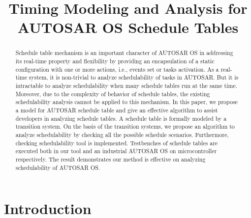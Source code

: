 \documentclass[10pt,conference]{IEEEtran}
\begin{document}
\title{Timing Modeling and Analysis for AUTOSAR OS Schedule Tables}

\author{
}
\maketitle
\begin{abstract}
Schedule table mechanism is an important character of AUTOSAR OS in addressing its real-time property and flexibility by providing an encapsulation of a static configuration with one or more actions, i.e., events set or tasks activation. As a real-time system, it is non-trivial to analyze schedulability of tasks in AUTOSAR. But it is intractable to analyze schedulability when many schedule tables run at the same time. Moreover, due to the complexity of behavior of schedule tables, the existing schedulability analysis cannot be applied to this mechanism. In this paper, we propose a model for AUTOSAR schedule table and give an effective algorithm to assist developers in analyzing schedule tables. A schedule table is formally modeled by a transition system. On the basis of the transition systems, we propose an algorithm to analyze schedulability by checking all the possible schedule scenarios. Furthermore, checking schedulability tool is implemented. Testbenches of schedule tables are executed both in our tool and an industrial AUTOSAR OS on microcontroller respectively. The result demonstrates our method is effective on analyzing schedulability of AUTOSAR OS.
\end{abstract}
\IEEEpeerreviewmaketitle
\section{Introduction}
\end{document}
